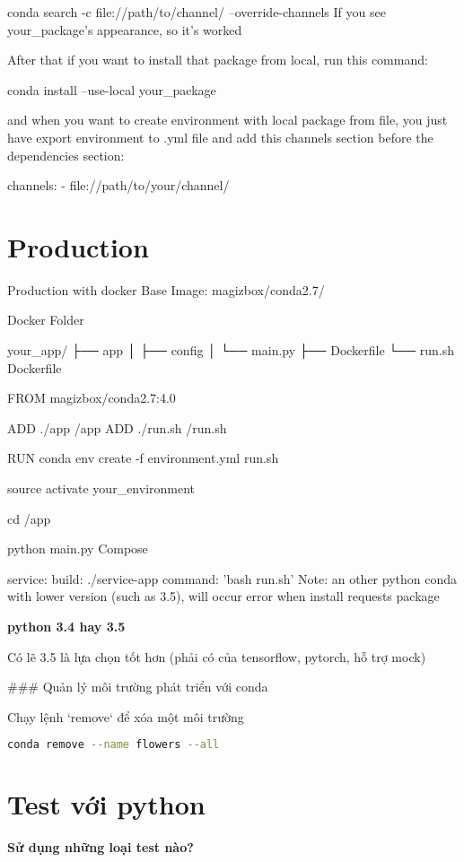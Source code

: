 conda search -c file://path/to/channel/ --override-channels
If you see your_package's appearance, so it's worked

After that if you want to install that package from local, run this command:


conda install --use-local your_package

and when you want to create environment with local package from file, you just have export environment to .yml file and add this channels section before the dependencies section:


channels:
- file://path/to/your/channel/

\section{Production}

Production with docker
Base Image: magizbox/conda2.7/

Docker Folder

your_app/
├── app
│   ├── config
│   └── main.py
├── Dockerfile
└── run.sh
Dockerfile

FROM magizbox/conda2.7:4.0

ADD ./app /app
ADD ./run.sh /run.sh

RUN conda env create -f environment.yml
run.sh

source activate your_environment

cd /app

python main.py
Compose

 service:
  build: ./service-app
  command: 'bash run.sh'
Note: an other python conda with lower version (such as 3.5), will occur error when install requests package

\noindent \textbf{python 3.4 hay 3.5}

Có lẽ 3.5 là lựa chọn tốt hơn (phải có của tensorflow, pytorch, hỗ trợ mock)

### Quản lý môi trường phát triển với conda

Chạy lệnh `remove` để xóa một môi trường

\begin{lstlisting}[language=bash]
conda remove --name flowers --all
\end{lstlisting}

\section{Test với python}

\textbf{Sử dụng những loại test nào?}

